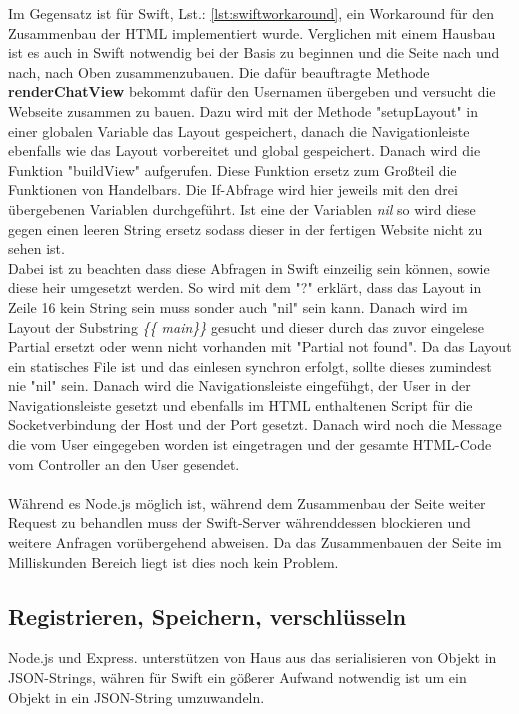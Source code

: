 Im Gegensatz ist für Swift, Lst.: \ref{lst:swiftworkaround}, ein Workaround für den Zusammenbau der HTML implementiert wurde. Verglichen mit einem Hausbau ist es auch in Swift notwendig bei der Basis zu beginnen und die Seite nach und nach, nach Oben zusammenzubauen. Die dafür beauftragte Methode \textbf{renderChatView} bekommt dafür den Usernamen übergeben und versucht die Webseite zusammen zu bauen. Dazu wird mit der Methode "setupLayout" in einer globalen Variable das Layout gespeichert, danach die Navigationleiste ebenfalls wie das Layout vorbereitet und global gespeichert. Danach wird die Funktion "buildView" aufgerufen. Diese Funktion ersetz zum Großteil die Funktionen von Handelbars. Die If-Abfrage wird hier jeweils mit den drei übergebenen Variablen durchgeführt. Ist eine der Variablen \textit{nil} so wird diese gegen einen leeren String ersetz sodass dieser in der fertigen Website nicht zu sehen ist. \\
Dabei ist zu beachten dass diese Abfragen in Swift einzeilig sein können, sowie diese heir umgesetzt werden. So wird mit dem "?" erklärt, dass das Layout in Zeile 16 kein String sein muss sonder auch "nil" sein kann. Danach wird im Layout der Substring \textit{\{\{ main\}\}} gesucht und dieser durch das zuvor eingelese Partial ersetzt oder wenn nicht vorhanden mit "Partial not found". Da das Layout ein statisches File ist und das einlesen synchron erfolgt, sollte dieses zumindest nie "nil" sein. Danach wird die Navigationsleiste eingefühgt, der User in der Navigationsleiste gesetzt und ebenfalls im HTML enthaltenen Script für die Socketverbindung der Host und der Port gesetzt. Danach wird noch die Message die vom User eingegeben worden ist eingetragen und der gesamte HTML-Code vom Controller an den User gesendet. 
\\\\
Während es Node.js möglich ist, während dem Zusammenbau der Seite weiter Request zu behandlen muss der Swift-Server währenddessen blockieren und weitere Anfragen vorübergehend abweisen. Da das Zusammenbauen der Seite im Milliskunden Bereich liegt ist dies noch kein Problem.


\subsection{Registrieren, Speichern, verschlüsseln}
Node.js und Express. unterstützen von Haus aus das serialisieren von Objekt in JSON-Strings, währen für Swift ein gößerer Aufwand notwendig ist um ein Objekt in ein JSON-String umzuwandeln.

